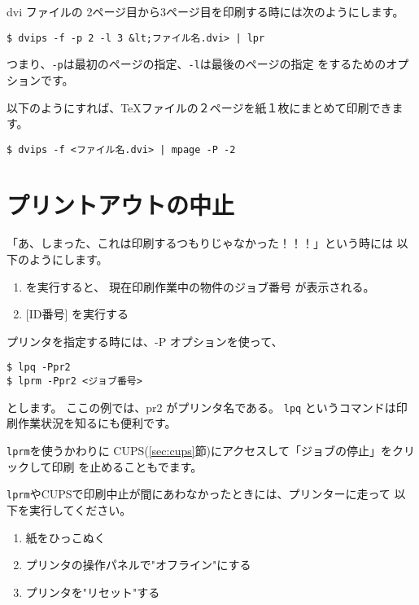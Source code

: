 \documentclass{jreport}
\begin{document}
dvi ファイルの 2ページ目から3ページ目を印刷する時には次のようにします。
\begin{screen}
\begin{verbatim}
$ dvips -f -p 2 -l 3 &lt;ファイル名.dvi> | lpr
\end{verbatim}
\end{screen}

つまり、\verb|-p|は最初のページの指定、\verb|-l|は最後のページの指定
をするためのオプションです。

以下のようにすれば、TeXファイルの２ページを紙１枚にまとめて印刷できま
す。
\begin{screen}
\begin{verbatim}
$ dvips -f <ファイル名.dvi> | mpage -P -2
\end{verbatim}
\end{screen}

\section{プリントアウトの中止}

「あ、しまった、これは印刷するつもりじゃなかった！！！」という時には
以下のようにします。
\begin{enumerate}
\item {} を実行すると、 現在印刷作業中の物件のジョブ番号 が表示される。
\item {} [ID番号] を実行する
\end{enumerate}

プリンタを指定する時には、-P オプションを使って、
\begin{screen}
\begin{verbatim}
$ lpq -Ppr2
$ lprm -Ppr2 <ジョブ番号>
\end{verbatim}
\end{screen}
とします。
ここの例では、pr2 がプリンタ名である。
\verb|lpq| というコマンドは印刷作業状況を知るにも便利です。

\verb|lprm|を使うかわりに
CUPS(\ref{sec:cups}節)にアクセスして「ジョブの停止」をクリックして印刷
を止めることもでます。

\verb|lprm|やCUPSで印刷中止が間にあわなかったときには、プリンターに走って
以下を実行してください。
\begin{enumerate}
\item 紙をひっこぬく
\item プリンタの操作パネルで"オフライン"にする
\item プリンタを"リセット"する
\end{enumerate}
\end{document}

